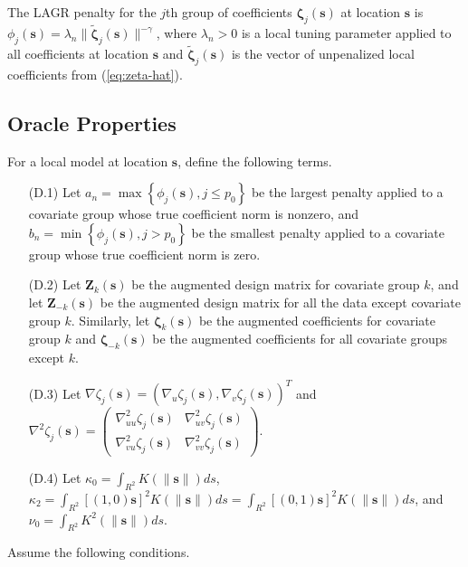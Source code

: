 \documentclass[english]{article}\usepackage[]{graphicx}\usepackage[]{color}
\theoremstyle{plain}
\theoremstyle{plain}
\begin{document}
The LAGR penalty for the $j$th group of coefficients $\bm{\zeta}_{j}(\bm{s})$
at location $\bm{s}$ is $\phi_{j}(\bm{s})=\lambda_{n}\|\tilde{\bm{\zeta}}_{j}(\bm{s})\|^{-\gamma}$,
where $\lambda_{n}>0$ is a local tuning parameter applied to all
coefficients at location $\bm{s}$ and $\tilde{\bm{\zeta}}_{j}(\bm{s})$
is the vector of unpenalized local coefficients from (\ref{eq:zeta-hat}).


\subsection{Oracle Properties\label{sub:oracle-properties}}

For a local model at location $\bm{s}$, define the following terms.
\begin{itemize}
\item[(D.1)] Let $a_{n}=\max\left\{ \phi_{j}\left(\bm{s}\right),j\le p_{0}\right\} $
be the largest penalty applied to a covariate group whose true coefficient
norm is nonzero, and $b_{n}=\min\left\{ \phi_{j}\left(\bm{s}\right),j>p_{0}\right\} $
be the smallest penalty applied to a covariate group whose true coefficient
norm is zero.
\item[(D.2)] Let $\bm{Z}_{k}\left(\bm{s}\right)$ be the augmented design matrix
for covariate group $k$, and let $\bm{Z}_{-k}\left(\bm{s}\right)$
be the augmented design matrix for all the data except covariate group
$k$. Similarly, let $\bm{\zeta}_{k}\left(\bm{s}\right)$ be the augmented
coefficients for covariate group $k$ and $\bm{\zeta}_{-k}\left(\bm{s}\right)$
be the augmented coefficients for all covariate groups except $k$.
\item[(D.3)] Let $\nabla\zeta_{j}\left(\bm{s}\right)=\left(\nabla_{u}\zeta_{j}\left(\bm{s}\right),\nabla_{v}\zeta_{j}\left(\bm{s}\right)\right)^{T}$
and $\nabla^{2}\zeta_{j}\left(\bm{s}\right)=\left(\begin{array}{cc}
\nabla_{uu}^{2}\zeta_{j}\left(\bm{s}\right) & \nabla_{uv}^{2}\zeta_{j}\left(\bm{s}\right)\\
\nabla_{vu}^{2}\zeta_{j}\left(\bm{s}\right) & \nabla_{vv}^{2}\zeta_{j}\left(\bm{s}\right)
\end{array}\right)$.
\item[(D.4)] Let $\kappa_{0}=\int_{R^{2}}K\left(\|\bm{s}\|\right)ds$, $\kappa_{2}=\int_{R^{2}}[(1,0)\bm{s}]^{2}K\left(\|\bm{s}\|\right)ds=\int_{R^{2}}[(0,1)\bm{s}]^{2}K\left(\|\bm{s}\|\right)ds$,
and $\nu_{0}=\int_{R^{2}}K^{2}\left(\|\bm{s}\|\right)ds$.
\end{itemize}
Assume the following conditions.
\end{document}
